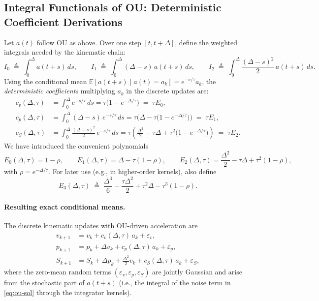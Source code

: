 \documentclass[10pt]{extarticle}
\begin{document}
\subsection{Integral Functionals of OU: Deterministic Coefficient Derivations}
Let $a(t)$ follow OU as above. Over one step $[t,t+\Delta]$, define the weighted
integrals needed by the kinematic chain:
\begin{equation}
I_0 \;\triangleq\; \int_0^\Delta a(t+s)\,ds,\qquad
I_1 \;\triangleq\; \int_0^\Delta (\Delta-s)\,a(t+s)\,ds,\qquad
I_2 \;\triangleq\; \int_0^\Delta \frac{(\Delta-s)^2}{2}\,a(t+s)\,ds.
\label{eq:ou-I012}
\end{equation}
Using the conditional mean $\mathbb{E}[a(t+s)\mid a(t){=}a_k]=e^{-s/\tau} a_k$,
the \emph{deterministic coefficients} multiplying $a_k$ in the discrete updates are:
\begin{align}
c_v(\Delta,\tau)
&= \int_0^\Delta e^{-s/\tau}\,ds
= \tau\big(1-e^{-\Delta/\tau}\big)
\;=\; \tau E_0, 
\label{eq:cv-ou}
\\
c_p(\Delta,\tau)
&= \int_0^\Delta (\Delta-s)\,e^{-s/\tau}\,ds
= \tau\Big(\Delta - \tau\big(1-e^{-\Delta/\tau}\big)\Big)
\;=\; \tau E_1, 
\label{eq:cp-ou}
\\
c_S(\Delta,\tau)
&= \int_0^\Delta \frac{(\Delta-s)^2}{2}\,e^{-s/\tau}\,ds
= \tau\left(\frac{\Delta^2}{2} - \tau\Delta + \tau^2\big(1-e^{-\Delta/\tau}\big)\right)
\;=\; \tau E_2.
\label{eq:cS-ou}
\end{align}
We have introduced the convenient polynomials
\begin{equation}
E_0(\Delta,\tau)=1-\rho,\qquad
E_1(\Delta,\tau)=\Delta - \tau(1-\rho),\qquad
E_2(\Delta,\tau)=\frac{\Delta^2}{2} - \tau\Delta + \tau^2(1-\rho),
\label{eq:E012}
\end{equation}
with $\rho=e^{-\Delta/\tau}$. For later use (e.g., in higher-order kernels), also define
\begin{equation}
E_3(\Delta,\tau)
\;\triangleq\;
\frac{\Delta^3}{6} - \frac{\tau\Delta^2}{2} + \tau^2\Delta - \tau^3(1-\rho).
\label{eq:E3}
\end{equation}

\paragraph{Resulting exact conditional means.}
The discrete kinematic updates with OU-driven acceleration are
\begin{align}
v_{k+1} &= v_k + c_v(\Delta,\tau)\,a_k + \varepsilon_v, \label{eq:v-disc-mean}\\
p_{k+1} &= p_k + \Delta v_k + c_p(\Delta,\tau)\,a_k + \varepsilon_p, \label{eq:p-disc-mean}\\
S_{k+1} &= S_k + \Delta p_k + \frac{\Delta^2}{2} v_k + c_S(\Delta,\tau)\,a_k + \varepsilon_S, \label{eq:S-disc-mean}
\end{align}
where the zero-mean random terms $(\varepsilon_v,\varepsilon_p,\varepsilon_S)$ are jointly Gaussian and arise from the
stochastic part of $a(t+s)$ (i.e., the integral of the noise term in \eqref{eq:ou-sol} through the integrator kernels).
\end{document}
